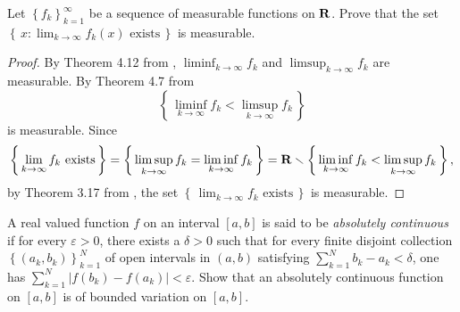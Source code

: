 \begin{problem}
Let $\left\{f_k\right\}_{k=1}^\infty$ be a sequence of measurable functions
on $\mathbf{R}$. Prove that the set
$\left\{\,x:\text{$\lim_{k\to\infty} f_k(x)$ exists}\,\right\}$
is measurable.
\end{problem}
\begin{proof}
By Theorem 4.12 from \cite[Ch.\@ 4, p.\@
67]{wheeden-zygmund}, $\liminf_{k\to\infty}f_k$ and
$\limsup_{k\to\infty}f_k$ are measurable. By Theorem 4.7 from \cite[Ch.\@ 4,
p.\@ 66]{wheeden-zygmund}
\begin{equation}
\label{eq:prep:1:12}
\left\{\,\liminf_{k\to\infty} f_k<\limsup_{k\to\infty} f_k\,\right\}
\end{equation}
is measurable. Since
\begin{equation}
  \label{eq:prep:1:13}
\left\{\,\text{$\lim_{k\to\infty}f_k$ exists}\,\right\}=
\left\{\,{\limsup_{k\to\infty}f_k=\liminf_{k\to\infty}f_k}\,\right\}=
\mathbf{R}\smallsetminus
\left\{\,{\liminf_{k\to\infty} f_k<\limsup_{k\to\infty} f_k}\,\right\},
\end{equation}
by Theorem 3.17 from \cite[Ch.\@ 3, p.\@ 48]{wheeden-zygmund},
the set $\left\{\,\text{$\lim_{k\to\infty}f_k$ exists}\,\right\}$ is
measurable.
\end{proof}
\begin{problem}
A real valued function $f$ on an interval $[a,b]$ is said to be
\emph{absolutely continuous} if for every $\varepsilon>0$, there exists a
$\delta>0$ such that for every finite disjoint collection
$\left\{(a_k,b_k)\right\}_{k=1}^N$ of open intervals in $(a,b)$ satisfying
$\sum_{k=1}^Nb_k-a_k<\delta$, one has
$\sum_{k=1}^N\left|f(b_k)-f(a_k)\right|<\varepsilon$. Show that an
absolutely continuous function on $[a,b]$ is of bounded variation on
$[a,b]$.
\end{problem}
